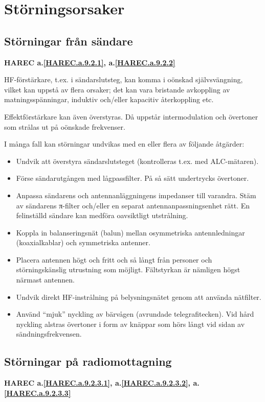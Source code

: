 \section{Störningsorsaker}

\subsection{Störningar från sändare}
\textbf{
HAREC a.\ref{HAREC.a.9.2.1}\label{myHAREC.a.9.2.1},
 a.\ref{HAREC.a.9.2.2}\label{myHAREC.a.9.2.2}
}

HF-förstärkare, t.ex. i sändarslutsteg, kan komma i oönskad självsvängning,
vilket kan uppstå av flera orsaker; det kan vara bristande avkoppling av
matningsspänningar, induktiv och/eller kapacitiv återkoppling etc.

Effektförstärkare kan även överstyras. Då uppstår intermodulation och övertoner
som strålas ut på oönskade frekvenser.

I många fall kan störningar undvikas med en eller flera av följande åtgärder:
\begin{itemize}
\item Undvik att överstyra sändarslutsteget (kontrolleras t.ex. med
  ALC-mätaren).
\item Förse sändarutgången med lågpassfilter.  På så sätt undertrycks
  övertoner.
\item Anpassa sändarens och antennanläggningens impedanser till
  varandra. Stäm av sändarens π-filter och/eller en separat
  antennanpassningsenhet rätt. En felinställd sändare kan medföra
  oavsiktligt utstrålning.
\item Koppla in balanseringsnät (balun) mellan osymmetriska
  antennledningar (koaxialkablar) och symmetriska antenner.
\item Placera antennen högt och fritt och så långt från personer och
  störningskänslig utrustning som möjligt. Fältstyrkan är nämligen
  högst närmast antennen.
\item Undvik direkt HF-instrålning på belysningsnätet genom att
  använda nätfilter.
\item Använd ``mjuk'' nyckling av bärvågen (avrundade
  telegrafitecken). Vid hård nyckling alstras övertoner i form av
  knäppar som hörs långt vid sidan av sändningsfrekvensen.
\end{itemize}

\subsection{Störningar på radiomottagning}
\textbf{
HAREC a.\ref{HAREC.a.9.2.3.1}\label{myHAREC.a.9.2.3.1},
 a.\ref{HAREC.a.9.2.3.2}\label{myHAREC.a.9.2.3.2},
 a.\ref{HAREC.a.9.2.3.3}\label{myHAREC.a.9.2.3.3}
}

